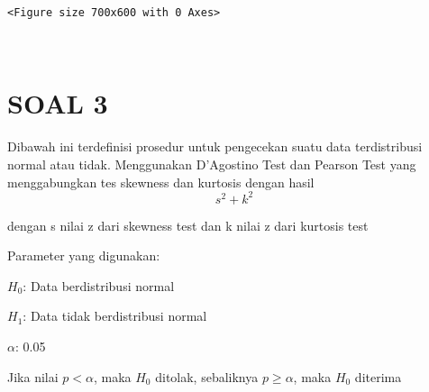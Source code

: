 \documentclass[11pt]{article}
\begin{document}
    
    \begin{Verbatim}[commandchars=\\\{\}]
<Figure size 700x600 with 0 Axes>
    \end{Verbatim}

    
    \begin{center}
    \end{center}
    { \hspace*{\fill} \\}
    
    \hypertarget{soal-3}{%
\section{SOAL 3}\label{soal-3}}

    Dibawah ini terdefinisi prosedur untuk pengecekan suatu data
terdistribusi normal atau tidak. Menggunakan D'Agostino Test dan Pearson
Test yang menggabungkan tes skewness dan kurtosis dengan hasil
\[s^2 + k^2\]

dengan s nilai z dari skewness test dan k nilai z dari kurtosis test

Parameter yang digunakan:

\(H_0\): Data berdistribusi normal

\(H_1\): Data tidak berdistribusi normal

\(\alpha\): 0.05

Jika nilai \(p < \alpha\), maka \(H_0\) ditolak, sebaliknya
\(p \geq \alpha\), maka \(H_0\) diterima
\end{document}
